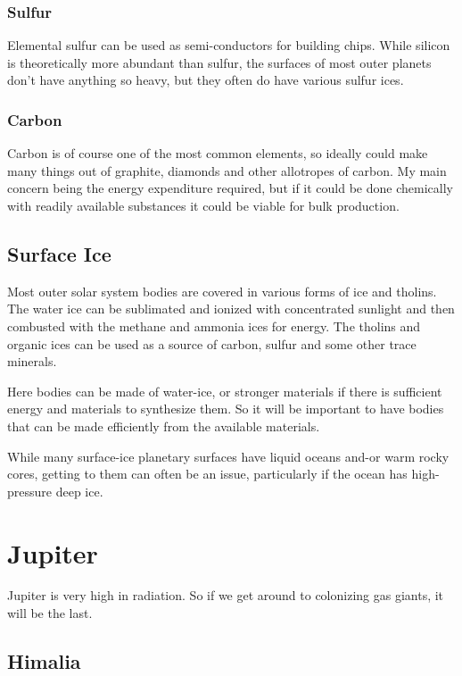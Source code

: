\subsubsection{Sulfur}

Elemental sulfur can be used as semi-conductors for building chips. 
While silicon is theoretically more abundant than sulfur, the surfaces of most
outer planets don't have anything so heavy, but they often do have various
sulfur ices. 

\subsubsection{Carbon}
Carbon is of course one of the most common elements, so ideally could make many
things out of graphite, diamonds and other allotropes of carbon. 
My main concern being the energy expenditure required, but if it could be done
chemically with readily available substances it could be viable for bulk
production. 

\subsection{Surface Ice}
Most outer solar system bodies are covered in various forms of ice and tholins.
The water ice can be sublimated and ionized with concentrated sunlight and then
combusted with the methane and ammonia ices for energy. The tholins and organic
ices can be used as a source of carbon, sulfur and some other trace minerals. 

Here bodies can be made of water-ice, or stronger materials if there is
sufficient energy and materials to synthesize them. So it will be important to 
have bodies that can be made efficiently from the available materials.  

While many surface-ice planetary surfaces have 
liquid oceans and-or warm rocky cores, getting to them can often be an issue,
particularly if the ocean has high-pressure deep ice. 


\section{Jupiter}
Jupiter is very high in radiation.  So if we get around to colonizing gas
giants, it will be the last. 

\subsection{Himalia}

